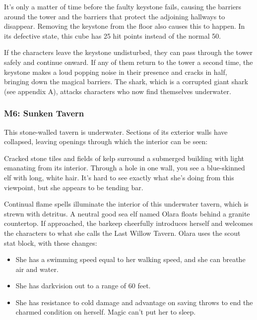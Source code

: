 \documentclass[10pt,a4paper,twoside,twocolumn,openany,nodeprecatedcode]{dndbook}
\begin{document}
It's only a matter of time before the faulty keystone fails, causing the barriers around the tower and the barriers that protect the adjoining hallways to disappear. Removing the keystone from the floor also causes this to happen. In its defective state, this cube has 25 hit points instead of the normal 50.

If the characters leave the keystone undisturbed, they can pass through the tower safely and continue onward. If any of them return to the tower a second time, the keystone makes a loud popping noise in their presence and cracks in half, bringing down the magical barriers. The shark, which is a corrupted giant shark (see appendix A), attacks characters who now find themselves underwater.

\subsubsection{M6: Sunken Tavern}
This stone-walled tavern is underwater. Sections of its exterior walls have collapsed, leaving openings through which the interior can be seen:

\begin{DndReadAloud}{}
Cracked stone tiles and fields of kelp surround a submerged building with light emanating from its interior. Through a hole in one wall, you see a blue-skinned elf with long, white hair. It's hard to see exactly what she's doing from this viewpoint, but she appears to be tending bar.

\end{DndReadAloud}

Continual flame spells illuminate the interior of this underwater tavern, which is strewn with detritus. A neutral good sea elf named Olara floats behind a granite countertop. If approached, the barkeep cheerfully introduces herself and welcomes the characters to what she calls the Last Willow Tavern. Olara uses the scout stat block, with these changes:


\begin{itemize}
\item She has a swimming speed equal to her walking speed, and she can breathe air and water.
\item She has darkvision out to a range of 60 feet.
\item She has resistance to cold damage and advantage on saving throws to end the charmed condition on herself. Magic can't put her to sleep.
\end{itemize}
\end{document}
